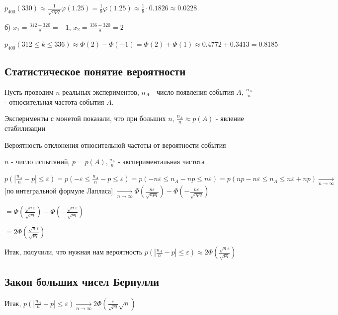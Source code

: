 \documentclass[12pt]{article}
\begin{document}
    $p_{400}(330) \approx \frac{1}{\sqrt{npq}} \varphi(1.25) = \frac{1}{8} \varphi(1.25) \approx \frac{1}{8} \cdot 0.1826 \approx 0.0228$

    б) $x_1 = \frac{312 - 320}{8} = -1$, $x_2 = \frac{336 - 320}{8} = 2$

    $p_{400}(312 \leq k \leq 336) \approx \Phi(2) - \Phi(-1) = \Phi(2) + \Phi(1) \approx 0.4772 + 0.3413 = 0.8185$

    \subsection{Статистическое понятие вероятности}

    Пусть проводим $n$ реальных экспериментов, $n_A$ - число появления события $A$, $\frac{n_A}{n}$ - относительная частота события $A$.

    Эксперименты с монетой показали, что при больших $n$, $\frac{n_A}{n} \approx p(A)$ - явление стабилизации

    Вероятность отклонения относительной частоты от вероятности события

    $n$ - число испытаний, $p = p(A), \frac{n_A}{n}$ - экспериментальная частота

    $p\left(|\frac{n_A}{n} - p| \leq \varepsilon\right) = p\left(-\varepsilon \leq \frac{n_A}{n} - p \leq \varepsilon\right) = p(-n\varepsilon \leq n_A - np \leq n\varepsilon) = p(np - n\varepsilon \leq n_A \leq n\varepsilon + np) \underset{n \to \infty}{\longrightarrow}$ [по интегральной формуле Лапласа] $\underset{n \to \infty}{\longrightarrow} \Phi\left(\frac{n\varepsilon}{\sqrt{npq}}\right) - \Phi\left(-\frac{n\varepsilon}{\sqrt{npq}}\right)$

    $ = \Phi\left(\frac{\sqrt{n}\varepsilon}{\sqrt{pq}}\right) - \Phi\left(-\frac{\sqrt{n}\varepsilon}{\sqrt{pq}}\right)$

    $ = 2\Phi\left(\frac{\sqrt{n}\varepsilon}{\sqrt{pq}}\right)$

    Итак, получили, что нужная нам вероятность $p\left(|\frac{n_A}{n} - p| \leq \varepsilon\right) \approx 2\Phi\left(\frac{\sqrt{n}\varepsilon}{\sqrt{pq}}\right)$

    \subsection{Закон больших чисел Бернулли}

    Итак, $p\left(|\frac{n_A}{n} - p| \leq \varepsilon\right) \underset{n \to \infty}{\longrightarrow} 2 \Phi\left(\frac{\varepsilon}{\sqrt{pq}}\sqrt{n}\right)$
\end{document}
